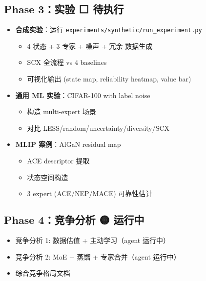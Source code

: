 \documentclass[
  12pt,
]{ctexart}
\providecommand{\tightlist}{%
  \setlength{\itemsep}{0pt}\setlength{\parskip}{0pt}}
\begin{document}
\subsection{Phase 3：实验 ⬜
待执行}\label{phase-3ux5b9eux9a8c-ux5f85ux6267ux884c}

\begin{itemize}
\tightlist
\item[$\square$]
  \textbf{合成实验}：运行
  \texttt{experiments/synthetic/run\_experiment.py}

  \begin{itemize}
  \tightlist
  \item[$\square$]
    4 状态 + 3 专家 + 噪声 + 冗余 数据生成
  \item[$\square$]
    SCX 全流程 vs 4 baselines
  \item[$\square$]
    可视化输出 (state map, reliability heatmap, value bar)
  \end{itemize}
\item[$\square$]
  \textbf{通用 ML 实验}：CIFAR-100 with label noise

  \begin{itemize}
  \tightlist
  \item[$\square$]
    构造 multi-expert 场景
  \item[$\square$]
    对比 LESS/random/uncertainty/diversity/SCX
  \end{itemize}
\item[$\square$]
  \textbf{MLIP 案例}：AlGaN residual map

  \begin{itemize}
  \tightlist
  \item[$\square$]
    ACE descriptor 提取
  \item[$\square$]
    状态空间构造
  \item[$\square$]
    3 expert (ACE/NEP/MACE) 可靠性估计
  \end{itemize}
\end{itemize}

\subsection{Phase 4：竞争分析 🟡
运行中}\label{phase-4ux7adeux4e89ux5206ux6790-ux8fd0ux884cux4e2d}

\begin{itemize}
\tightlist
\item[$\square$]
  竞争分析 1: 数据估值 + 主动学习（agent 运行中）
\item[$\square$]
  竞争分析 2: MoE + 蒸馏 + 专家合并（agent 运行中）
\item[$\square$]
  综合竞争格局文档
\end{itemize}
\end{document}
